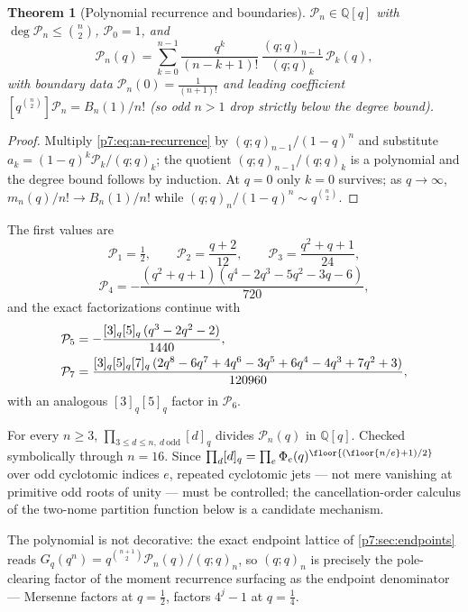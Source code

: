 \documentclass[11pt,oneside]{article}
\numberwithin{equation}{section}
\newtheorem{theorem}{Theorem}[section]
\theoremstyle{definition}
\theoremstyle{remark}
\newcommand{\Q}{\mathbb Q}
\begin{document}
\begin{theorem}[Polynomial recurrence and boundaries]
\label{p7:thm:Pn}
$\mathcal P_n\in\Q[q]$ with $\deg\mathcal P_n\le\binom n2$,
$\mathcal P_0=1$, and
\begin{equation}\label{p7:eq:Pn-recurrence}
 \mathcal P_n(q)=
 \sum_{k=0}^{n-1}\frac{q^k}{(n-k+1)!}\,
 \frac{(q;q)_{n-1}}{(q;q)_k}\,\mathcal P_k(q),
\end{equation}
with boundary data
$\mathcal P_n(0)=\tfrac1{(n+1)!}$ and leading coefficient
$[q^{\binom n2}]\mathcal P_n=B_n(1)/n!$ (so odd $n>1$ drop strictly below the
degree bound).
\end{theorem}

\begin{proof}
Multiply \eqref{p7:eq:an-recurrence} by $(q;q)_{n-1}/(1-q)^n$ and substitute
$a_k=(1-q)^k\mathcal P_k/(q;q)_k$; the quotient
$(q;q)_{n-1}/(q;q)_k$ is a polynomial and the degree bound follows by
induction.  At $q=0$ only $k=0$ survives; as $q\to\infty$,
$m_n(q)/n!\to B_n(1)/n!$ while $(q;q)_n/(1-q)^n\sim q^{\binom n2}$.
\end{proof}

The first values are
\[
 \mathcal P_1=\tfrac12,\qquad
 \mathcal P_2=\frac{q+2}{12},\qquad
 \mathcal P_3=\frac{q^2+q+1}{24},
\]
\[
 \mathcal P_4=-\frac{(q^2+q+1)(q^4-2q^3-5q^2-3q-6)}{720},
\]
and the exact factorizations continue with
\begin{align}
 \mathcal P_5&=-\frac{[3]_q[5]_q\,(q^3-2q^2-2)}{1440},
 \notag\\
 \mathcal P_7&=\frac{[3]_q[5]_q[7]_q\,
 (2q^8-6q^7+4q^6-3q^5+6q^4-4q^3+7q^2+3)}{120960},
 \label{p7:eq:Pn-factorizations}
\end{align}
with an analogous $[3]_q[5]_q$ factor in $\mathcal P_6$.

\begin{conjecture}
\label{p7:conj:Pn-divisibility}
For every $n\ge3$,
$\prod_{3\le d\le n,\ d\ \mathrm{odd}}[d]_q$ divides $\mathcal P_n(q)$ in
$\Q[q]$.  Checked symbolically through $n=16$.  Since
$\prod_{d}[d]_q=\prod_e\Phi_e(q)^{\floor{(\floor{n/e}+1)/2}}$ over odd
cyclotomic indices $e$, repeated cyclotomic jets --- not mere vanishing at
primitive odd roots of unity --- must be controlled; the cancellation-order
calculus of the two-nome partition function below is a candidate mechanism.
\end{conjecture}

The polynomial is not decorative: the exact endpoint lattice of
\cref{p7:sec:endpoints} reads
$G_q(q^n)=q^{\binom{n+1}2}\mathcal P_n(q)/(q;q)_n$, so $(q;q)_n$ is precisely
the pole-clearing factor of the moment recurrence surfacing as the endpoint
denominator --- Mersenne factors at $q=\tfrac12$, factors $4^j-1$ at
$q=\tfrac14$.
\end{document}
